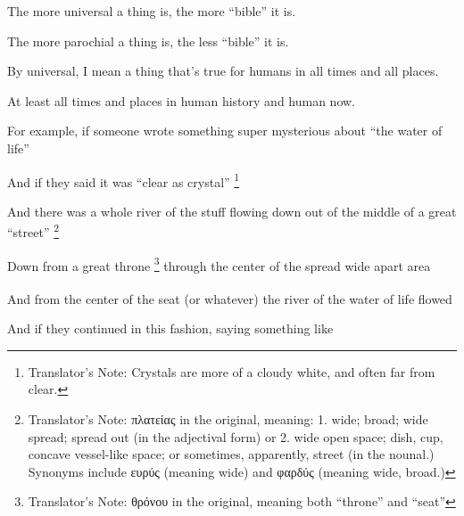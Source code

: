 {{				The more universal a thing is, the more ``bible'' it is.

				The more parochial a thing is, the less ``bible'' it is.

				By universal, I mean a thing that's true for humans in all times and all places.
				
				At least all times and places in human history and human now.

                For example, if someone wrote something super mysterious about ``the water of life''

                And if they said it was ``clear as crystal''%
                \footnote{%
                    Translator's Note: Crystals are more of a cloudy white,
                    and often far from clear.
                }%

                And there was a whole river of the stuff flowing down out of the middle of a great ``street''%
                \footnote{
                    Translator's Note: πλατείας in the original, meaning:
                    1. wide; broad; wide spread; spread out (in the adjectival form) or
                    2. wide open space; dish, cup, concave vessel-like space;
                       or sometimes, apparently, street (in the nounal.)
                    Synonyms include ευρύς (meaning wide) and φαρδύς (meaning wide, broad.)
                }\xdef\fnstreet{\thefootnote}%

                Down from a great throne%
                \footnote{
                    Translator's Note: θρόνου in the original, meaning both ``throne'' and ``seat''
                }\xdef\fnseat{\thefootnote}
                through the center of the spread wide apart area\textsuperscript{\fnstreet}

                And from the center of the seat\textsuperscript{\fnseat}
                (or whatever) the river of the water of life flowed

                And if they continued in this fashion, saying something like

}}
